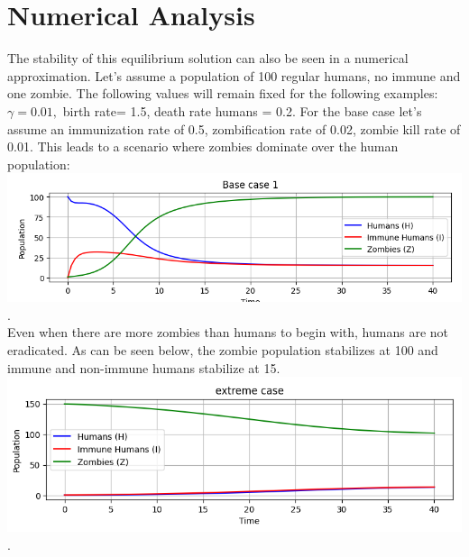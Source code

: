 \documentclass[
	12pt
]{article}
\begin{document}
\section{Numerical Analysis}
The stability of this equilibrium solution can also be seen in a numerical approximation. Let's assume a population of 100 regular humans, no immune and one zombie. The following values will remain fixed for the following examples: $\gamma= 0.01,$ birth rate= 1.5, death rate humans = 0.2. For the base case let's assume an immunization rate of 0.5, zombification rate of 0.02, zombie kill rate of 0.01. This leads to a scenario where zombies dominate over the human population:\\
\includegraphics[width=\textwidth]{base case.png}. \\
Even when there are more zombies than humans to begin with, humans are not eradicated. As can be seen below, the zombie population stabilizes at 100 and immune and non-immune humans stabilize at 15.\\
\includegraphics[width=\textwidth]{extreme case.png}.\\
\end{document}
